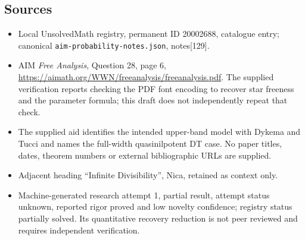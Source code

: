 \documentclass[11pt]{article}
\begin{document}
\subsection{Sources}
\begin{itemize}
\item Local UnsolvedMath registry, permanent ID 20002688, catalogue entry; canonical \texttt{aim-probability-notes.json}, notes[129].
\item AIM \emph{Free Analysis}, Question 28, page 6, \url{https://aimath.org/WWN/freeanalysis/freeanalysis.pdf}. The supplied verification reports checking the PDF font encoding to recover star freeness and the parameter formula; this draft does not independently repeat that check.
\item The supplied aid identifies the intended upper-band model with Dykema and Tucci and names the full-width quasinilpotent DT case. No paper titles, dates, theorem numbers or external bibliographic URLs are supplied.
\item Adjacent heading ``Infinite Divisibility'', Nica, retained as context only.
\item Machine-generated research attempt 1, partial result, attempt status unknown, reported rigor proved and low novelty confidence; registry status partially solved. Its quantitative recovery reduction is not peer reviewed and requires independent verification.
\end{itemize}
\end{document}
